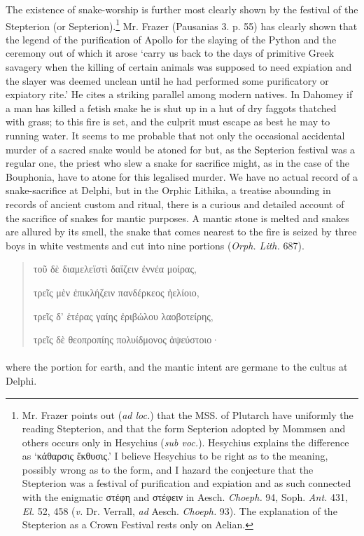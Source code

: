 \documentclass[a4paper, 11pt, oneside, polutonikogreek, english]{article}
\begin{document}
The existence of snake-worship is further most clearly shown by the festival of the Stepterion (or Septerion).\footnote{Mr. Frazer points out (\emph{ad loc.}) that the MSS. of Plutarch have uniformly the reading Stepterion, and that the form Septerion adopted by Mommsen and others occurs only in Hesychius (\emph{sub voc.}). Hesychius explains the difference as `κάθαρσις ἔκθυσις.' I believe Hesychius to be right as to the meaning, possibly wrong as to the form, and I hazard the conjecture that the Stepterion was a festival of purification and expiation and as such connected with the enigmatic στέφη and στέφειν in Aesch. \emph{Choeph.} 94, Soph. \emph{Ant.} 431, \emph{El.} 52, 458 (\emph{v.} Dr. Verrall, \emph{ad} Aesch. \emph{Choeph.} 93). The explanation of the Stepterion as a Crown Festival rests only on Aelian.} Mr. Frazer (Pausanias 3. p. 55) has clearly shown that the legend of the purification of Apollo for the slaying of the Python and the ceremony out of which it arose `carry us back to the days of primitive Greek savagery when the killing of certain animals was supposed to need expiation and the slayer was deemed unclean until he had performed some purificatory or expiatory rite.' He cites a striking parallel among modern natives. In Dahomey if a man has killed a fetish snake he is shut up in a hut of dry faggots thatched with grass; to this fire is set, and the culprit must escape as best he may to running water. It seems to me probable that not only the occasional accidental murder of a sacred snake would be atoned for but, as the Septerion festival was a regular one, the priest who slew a snake for sacrifice might, as in the case of the Bouphonia, have to atone for this legalised murder. We have no actual record of a snake-sacrifice at Delphi, but in the Orphic Lithika, a treatise abounding in records of ancient custom and ritual, there is a curious and detailed account of the sacrifice of snakes for mantic purposes. A mantic stone is melted and snakes are allured by its smell, the snake that comes nearest to the fire is seized by three boys in white vestments and cut into nine portions (\emph{Orph. Lith.} 687).
\begin{quotation}
τοῦ δὲ διαμελεϊστὶ δαΐζειν ἐννέα μοίρας,

τρεῖς μὲν ἐπικλήζειν πανδέρκεος ἠελίοιο,

τρεῖς δ' ἑτέρας γαίης ἐριβώλου λαοβοτείρης,

τρεῖς δὲ θεοπροπίης πολυίδμονος ἀψεύστοιο·
\end{quotation}
\paragraph{}
where the portion for earth, and the mantic intent are germane to the cultus at Delphi.
\end{document}
